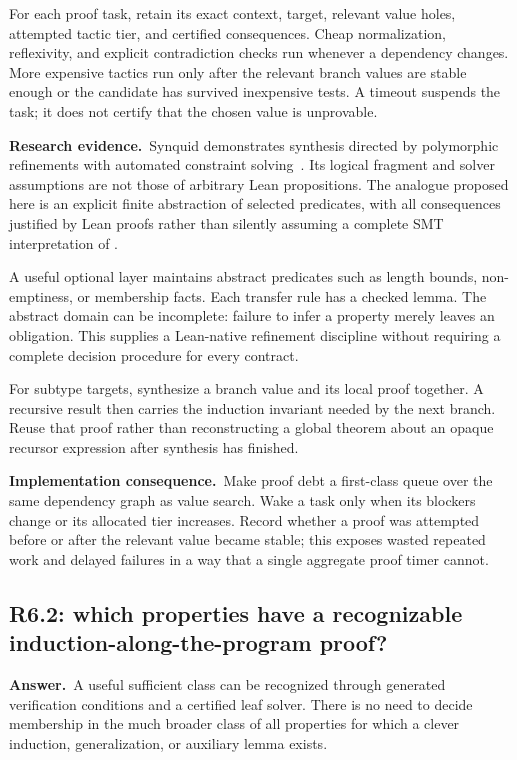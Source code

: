 \documentclass[11pt,a4paper]{article}
\theoremstyle{definition}
\theoremstyle{remark}
\newcommand{\code}[1]{\texttt{\detokenize{#1}}}
\newcommand{\ans}{\noindent\textbf{Answer.}\ }
\newcommand{\imp}{\par\noindent\textbf{Implementation consequence.}\ }
\newcommand{\lit}{\par\noindent\textbf{Research evidence.}\ }
\begin{document}
For each proof task, retain its exact context, target, relevant value holes,
attempted tactic tier, and certified consequences. Cheap normalization,
reflexivity, and explicit contradiction checks run whenever a dependency
changes. More expensive tactics run only after the relevant branch values are
stable enough or the candidate has survived inexpensive tests. A timeout
suspends the task; it does not certify that the chosen value is unprovable.

\lit Synquid demonstrates synthesis directed by polymorphic refinements with
automated constraint solving~\cite{synquid}. Its logical fragment and solver
assumptions are not those of arbitrary Lean propositions. The analogue proposed
here is an explicit finite abstraction of selected predicates, with all
consequences justified by Lean proofs rather than silently assuming a complete
SMT interpretation of \code{Prop}.

A useful optional layer maintains abstract predicates such as length bounds,
non-emptiness, or membership facts. Each transfer rule has a checked lemma.
The abstract domain can be incomplete: failure to infer a property merely
leaves an obligation. This supplies a Lean-native refinement discipline
without requiring a complete decision procedure for every contract.

For subtype targets, synthesize a branch value and its local proof together.
A recursive result then carries the induction invariant needed by the next
branch. Reuse that proof rather than reconstructing a global theorem about an
opaque recursor expression after synthesis has finished.

\imp Make proof debt a first-class queue over the same dependency graph as
value search. Wake a task only when its blockers change or its allocated tier
increases. Record whether a proof was attempted before or after the relevant
value became stable; this exposes wasted repeated work and delayed failures
in a way that a single aggregate proof timer cannot.

\subsection{R6.2: which properties have a recognizable induction-along-the-program proof?}\label{q:R6.2}
\ans A useful sufficient class can be recognized through generated verification
conditions and a certified leaf solver. There is no need to decide membership
in the much broader class of all properties for which a clever induction,
generalization, or auxiliary lemma exists.
\end{document}
